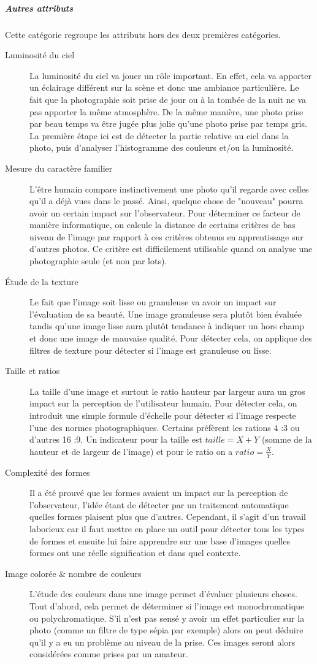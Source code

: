 \documentclass[11pt, french,screen]{report-rd-info}
\begin{document}
\subparagraph{Autres attributs}
Cette catégorie regroupe les attributs hors des deux premières catégories.
\begin{description}

\item[Luminosité du ciel]
La luminosité du ciel va jouer un rôle important. En effet, cela va apporter un éclairage différent sur la scène et donc une ambiance particulière. Le fait que la photographie soit prise de jour ou à la tombée de la nuit ne va pas apporter la même atmosphère. De la même manière, une photo prise par beau temps va être jugée plus jolie qu’une photo prise par temps gris. La première étape ici est de détecter la partie relative au ciel dans la photo, puis d’analyser l’histogramme des couleurs et/ou la luminosité.
\item[Mesure du caractère familier]
L’être humain compare instinctivement une photo qu’il regarde avec celles qu’il a déjà vues dans le passé. Ainsi, quelque chose de "nouveau" pourra avoir un certain impact sur l’observateur. Pour déterminer ce facteur de manière informatique, on calcule la distance de certains critères de bas niveau de l’image par rapport à ces critères obtenus en apprentissage sur d’autres photos. Ce critère est difficilement utilisable quand on analyse une photographie seule (et non par lots).
\item[Étude de la texture]
Le fait que l’image soit lisse ou granuleuse va avoir un impact sur l’évaluation de sa beauté. Une image granuleuse sera plutôt bien évaluée tandis qu’une image lisse aura plutôt tendance à indiquer un hors champ et donc une image de mauvaise qualité. Pour détecter cela, on applique des filtres de texture pour détecter si l’image est granuleuse ou lisse.
\item[Taille et ratios]
La taille d’une image et surtout le ratio hauteur par largeur aura un gros impact sur la perception de l’utilisateur humain. Pour détecter cela, on introduit une simple formule d’échelle pour détecter si l’image respecte l’une des normes photographiques. Certains préfèrent les rations 4 :3 ou d’autres 16 :9. Un indicateur pour la taille est $taille = X+Y$ (somme de la hauteur et de largeur de l'image) et pour le ratio on a $ratio = \frac{X}{Y}$.
\item[Complexité des formes]
Il a été prouvé que les formes avaient un impact sur la perception de l’observateur, l'idée étant de détecter par un traitement automatique quelles formes plaisent plus que d’autres. Cependant, il s’agit d’un travail laborieux car il faut mettre en place un outil pour détecter tous les types de formes et ensuite lui faire apprendre sur une base d’images quelles formes ont une réelle signification et dans quel contexte.
\item[Image colorée \& nombre de couleurs]
L’étude des couleurs dans une image permet d’évaluer plusieurs choses. Tout d’abord, cela permet de déterminer si l’image est monochromatique  ou polychromatique. S’il n’est pas sensé y avoir un effet particulier sur la photo (comme un filtre de type sépia par exemple) alors on peut déduire qu’il y a eu un problème au niveau de la prise. Ces images seront alors considérées comme prises par un amateur.


\end{description}
\end{document}

